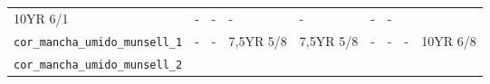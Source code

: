 \documentclass[
]{book}
\begin{document}
\begin{longtable}[]{@{}lllllllll@{}}
\begin{minipage}[t]{0.06\columnwidth}
10YR 6/1\strut
\end{minipage} & \begin{minipage}[t]{0.07\columnwidth}\raggedright
-\strut
\end{minipage} & \begin{minipage}[t]{0.07\columnwidth}\raggedright
-\strut
\end{minipage} & \begin{minipage}[t]{0.07\columnwidth}\raggedright
-\strut
\end{minipage} & \begin{minipage}[t]{0.07\columnwidth}\raggedright
-\strut
\end{minipage} & \begin{minipage}[t]{0.07\columnwidth}\raggedright
-\strut
\end{minipage} & \begin{minipage}[t]{0.06\columnwidth}\raggedright
-\strut
\end{minipage}\tabularnewline
\begin{minipage}[t]{0.22\columnwidth}\raggedright
\texttt{cor\_mancha\_umido\_munsell\_1}\strut
\end{minipage} & \begin{minipage}[t]{0.06\columnwidth}\raggedright
-\strut
\end{minipage} & \begin{minipage}[t]{0.06\columnwidth}\raggedright
-\strut
\end{minipage} & \begin{minipage}[t]{0.07\columnwidth}\raggedright
7,5YR 5/8\strut
\end{minipage} & \begin{minipage}[t]{0.07\columnwidth}\raggedright
7,5YR 5/8\strut
\end{minipage} & \begin{minipage}[t]{0.07\columnwidth}\raggedright
-\strut
\end{minipage} & \begin{minipage}[t]{0.07\columnwidth}\raggedright
-\strut
\end{minipage} & \begin{minipage}[t]{0.07\columnwidth}\raggedright
-\strut
\end{minipage} & \begin{minipage}[t]{0.06\columnwidth}\raggedright
10YR 6/8\strut
\end{minipage}\tabularnewline
\begin{minipage}[t]{0.22\columnwidth}\raggedright
\texttt{cor\_mancha\_umido\_munsell\_2}\strut

\end{minipage}
\end{longtable}
\end{document}
